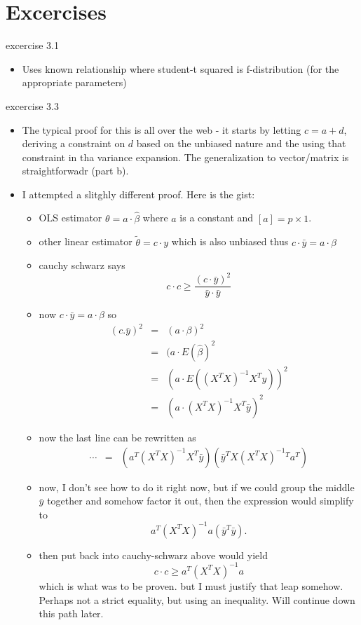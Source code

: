 \documentclass[a4paper]{report}
\newcommand{\<}{\textless}
\newcommand{\yb}{\bar{y}}
\renewcommand{\>}{\textgreater}
\begin{document}
\section{Excercises}

excercise 3.1
\begin{itemize}
  \item Uses known relationship where student-t squared is f-distribution (for the appropriate parameters)
\end{itemize}

excercise 3.3
\begin{itemize}
  \item The typical proof for this is all over the web - it starts by letting $c = a + d$, deriving a constraint on $d$ based on the unbiased nature and the using that constraint in tha variance expansion. The generalization to vector/matrix is straightforwadr (part b).
  \item I attempted a slitghly different proof. Here is the gist:
  \begin{itemize}
    \item OLS estimator $\theta = a \cdot \hat{\beta}$ where $a$ is a constant and $[a] = p\times 1$.
    \item other linear estimator $\tilde{\theta} = c \cdot y$ which is also unbiased
      \subitem thus $c \cdot \bar{y} = a \cdot \beta$
    \item cauchy schwarz says
      $$ c\cdot c \geq \frac{(c \cdot \bar{y})^2}{\bar{y}\cdot \bar{y}} $$
    \item now $c\cdot\bar{y} = a \cdot \beta$ so 
      \begin{eqnarray}
	(c.\bar{y})^2 &=& (a \cdot \beta)^2 \\
			&=& (a \cdot E(\hat{\beta})^2 \\
			  &=& (a \cdot E\left((X^TX)^{-1}X^Ty\right))^2 \\
			  &=& (a \cdot (X^TX)^{-1}X^T\yb)^2 
      \end{eqnarray}
    \item now the last line can be rewritten as
      \begin{eqnarray}
	\cdots &=& (a^T(X^TX)^{-1}X^T\yb)(\yb^TX(X^TX)^{-1}{}^Ta^T)
      \end{eqnarray}
    \item now, I don't see how to do it right now, but if we could group the middle $\yb$ together and somehow factor it out, then the expression would simplify to 
      $$a^T(X^TX)^{-1}a(\yb^T\yb).$$
    \item then put back into cauchy-schwarz above would yield
      $$c\cdot c \geq a^T(X^TX)^{-1}a$$
      which is what was to be proven. but I must justify that leap somehow. Perhaps not a strict equality, but using an inequality. Will continue down this path later.
  \end{itemize}
\end{itemize}
\end{document}
